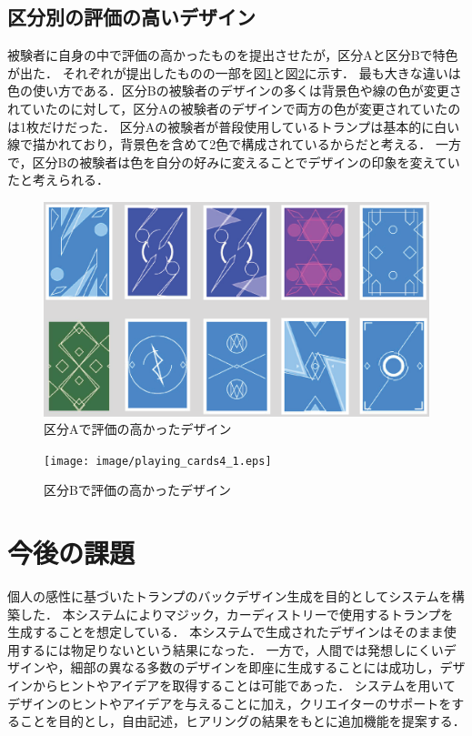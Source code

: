 \subsection{区分別の評価の高いデザイン}
被験者に自身の中で評価の高かったものを提出させたが，区分Aと区分Bで特色が出た．
それぞれが提出したものの一部を図\ref{A_design}と図\ref{B_design}に示す．
最も大きな違いは色の使い方である．区分Bの被験者のデザインの多くは背景色や線の色が変更されていたのに対して，区分Aの被験者のデザインで両方の色が変更されていたのは1枚だけだった．
区分Aの被験者が普段使用しているトランプは基本的に白い線で描かれており，背景色を含めて2色で構成されているからだと考える．
一方で，区分Bの被験者は色を自分の好みに変えることでデザインの印象を変えていたと考えられる．

\begin{figure}[b!]
    \begin{center}
        \centering
        \includegraphics[scale=0.6]{image/playing_cards1.eps}
        \caption{区分Aで評価の高かったデザイン}
        \label{A_design}
    \end{center}
\end{figure}

\begin{figure}[htbp]
    \begin{center}
        \centering
        \texttt{[image: image/playing\_cards4\_1.eps]}
        \caption{区分Bで評価の高かったデザイン}
        \label{B_design}
    \end{center}
\end{figure}


\section{今後の課題}
個人の感性に基づいたトランプのバックデザイン生成を目的としてシステムを構築した．
本システムによりマジック，カーディストリーで使用するトランプを生成することを想定している．
本システムで生成されたデザインはそのまま使用するには物足りないという結果になった．
一方で，人間では発想しにくいデザインや，細部の異なる多数のデザインを即座に生成することには成功し，デザインからヒントやアイデアを取得することは可能であった．
システムを用いてデザインのヒントやアイデアを与えることに加え，クリエイターのサポートをすることを目的とし，自由記述，ヒアリングの結果をもとに追加機能を提案する．

